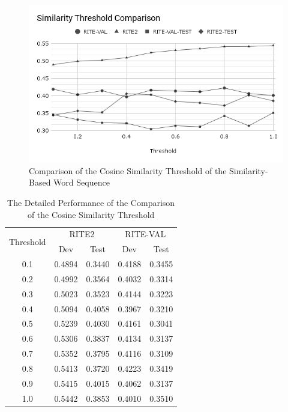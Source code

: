 \documentclass[12pt]{article}
\begin{document}
\begin{CJK*}{UTF8}{bkai}
\begin{spacing}{1.77}
\begin{figure}[H]
  \centering
  \includegraphics[width=15cm]{SimThresholdComp.png}
  \caption{Comparison of the Cosine Similarity Threshold of the Similarity-Based Word Sequence}
  \label{fig:threshold}
\end{figure}

\begin{table}[H]
  \centering
  \setlength{\extrarowheight}{-3pt}
  \caption{The Detailed Performance of the Comparison of the Cosine Similarity Threshold}
  \label{result:threshold_comparison}
  \begin{tabular}{|c|l|l|l|l|}
  \hline
  \multirow{2}{*}{Threshold} & \multicolumn{2}{c|}{RITE2} & \multicolumn{2}{c|}{RITE-VAL} \\ \cline{2-5}
   & \multicolumn{1}{c|}{Dev} & \multicolumn{1}{c|}{Test} & \multicolumn{1}{c|}{Dev} & \multicolumn{1}{c|}{Test} \\ \hline
  0.1 & 0.4894 & 0.3440 & 0.4188 & 0.3455 \\ \hline
  0.2 & 0.4992 & 0.3564 & 0.4032 & 0.3314 \\ \hline
  0.3 & 0.5023 & 0.3523 & 0.4144 & 0.3223 \\ \hline
  0.4 & 0.5094 & 0.4058 & 0.3967 & 0.3210 \\ \hline
  0.5 & 0.5239 & 0.4030 & 0.4161 & 0.3041 \\ \hline
  0.6 & 0.5306 & 0.3837 & 0.4134 & 0.3137 \\ \hline
  0.7 & 0.5352 & 0.3795 & 0.4116 & 0.3109 \\ \hline
  0.8 & 0.5413 & 0.3720 & 0.4223 & 0.3419 \\ \hline
  0.9 & 0.5415 & 0.4015 & 0.4062 & 0.3137 \\ \hline
  1.0 & 0.5442 & 0.3853 & 0.4010 & 0.3510 \\ \hline
  \end{tabular}
\end{table}


\end{spacing}
\end{CJK*}
\end{document}
